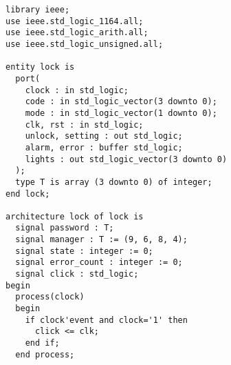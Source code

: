 \documentclass[a4paper]{article}
\begin{document}
    \begin{lstlisting}
library ieee;
use ieee.std_logic_1164.all;
use ieee.std_logic_arith.all;
use ieee.std_logic_unsigned.all;

entity lock is 
  port(
    clock : in std_logic;
    code : in std_logic_vector(3 downto 0);
    mode : in std_logic_vector(1 downto 0);
    clk, rst : in std_logic;
    unlock, setting : out std_logic;
    alarm, error : buffer std_logic;
    lights : out std_logic_vector(3 downto 0)
  );
  type T is array (3 downto 0) of integer;
end lock;

architecture lock of lock is
  signal password : T;
  signal manager : T := (9, 6, 8, 4);
  signal state : integer := 0;
  signal error_count : integer := 0;
  signal click : std_logic;
begin
  process(clock)
  begin
    if clock'event and clock='1' then
      click <= clk;
    end if;
  end process;
  

\end{lstlisting}
\end{document}

